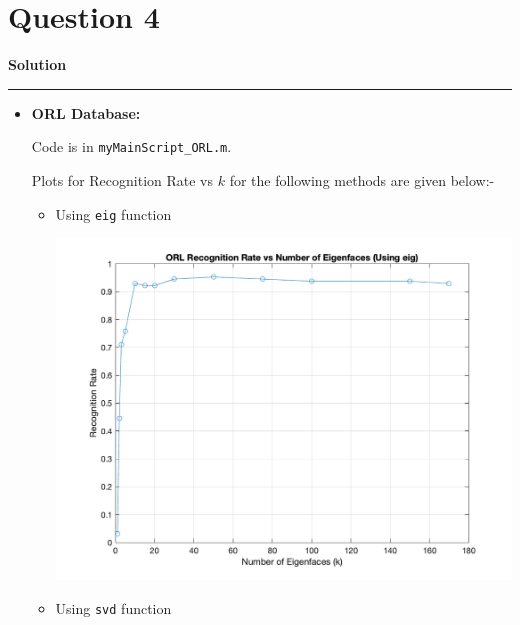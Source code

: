 \documentclass[a4paper,14pt]{article}
\title{\cooltitle{CS663 Assignment-4}}
\author{{\bf Saksham Rathi, Kavya Gupta, Shravan Srinivasa Raghavan} \\
\small Department of Computer Science, \\
Indian Institute of Technology Bombay \\}
\date{}
\newenvironment{solution}[2][]{%
    \begin{mdframed}[linecolor=blue!70!black, linewidth=2pt, roundcorner=10pt, backgroundcolor=yellow!10!white, skipabove=12pt, skipbelow=12pt]%
        \textbf{\large #2}
        \par\noindent\rule{\textwidth}{0.4pt}
}{
    \end{mdframed}
}
\begin{document}
\maketitle

\section*{Question 4}

\begin{solution}{Solution}
	\begin{itemize}
		\item \textbf{ORL Database:}

		Code is in \texttt{myMainScript\_ORL.m}.

		Plots for Recognition Rate vs $k$ for the following methods are given below:-

		\begin{itemize}
			\item Using \texttt{eig} function
			
			\begin{center}
				\includegraphics[scale=0.4]{../images/ORL_eig.png}
			\end{center}

			\item Using \texttt{svd} function
			

\end{itemize}
\end{itemize}
\end{solution}
\end{document}

